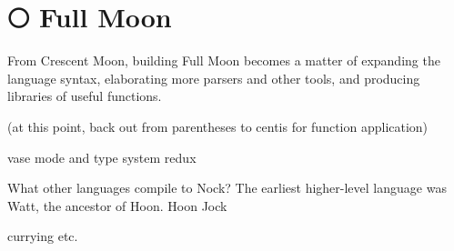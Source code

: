 \section{\textrm{🌕} Full Moon}

From Crescent Moon, building Full Moon becomes a matter of expanding the language syntax, elaborating more parsers and other tools, and producing libraries of useful functions.

(at this point, back out from parentheses to centis for function application)

vase mode and type system redux

What other languages compile to Nock?  The earliest higher-level language was Watt, the ancestor of Hoon. %
Hoon
Jock



currying etc.